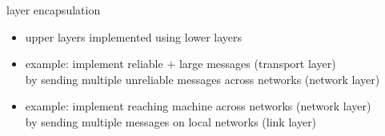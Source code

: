 \begin{frame}{layer encapsulation}
    \begin{itemize}
    \item upper layers implemented using lower layers
    \vspace{.5cm}
    \item example: implement reliable + large messages (transport layer) \\
        by sending multiple unreliable messages across networks (network layer)
    \item example: implement reaching machine across networks (network layer) \\
        by sending multiple messages on local networks (link layer)
    \end{itemize}
\end{frame}
